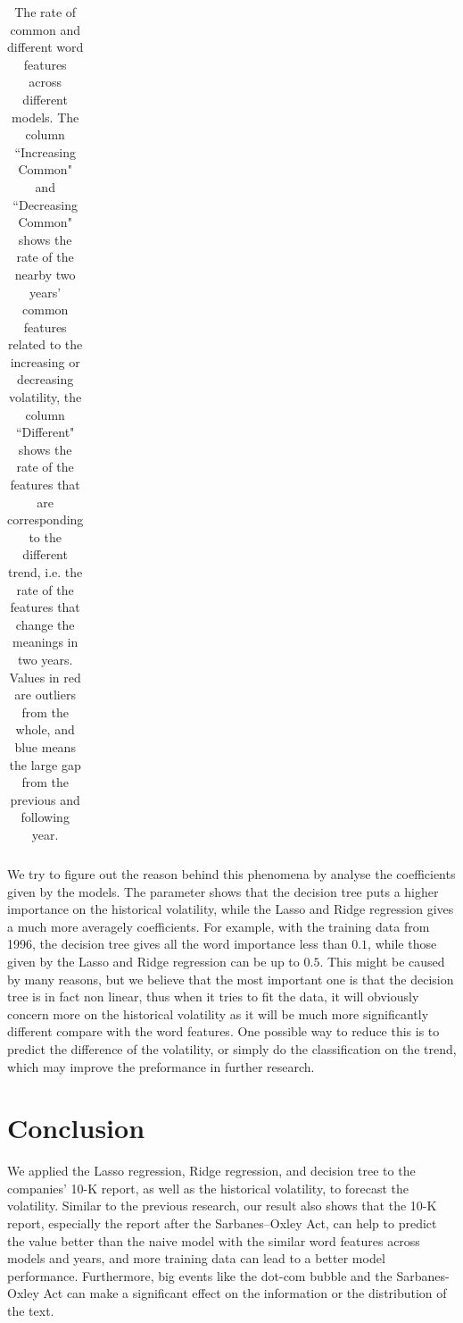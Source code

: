 \documentclass[11pt]{article}
\begin{document}
{\begin{table}[p]
\begin{tabular}{|c|c|c|c|c|}
      \hline
    \end{tabular}
    \caption{The rate of common and different word features across different models. The column ``Increasing Common" and ``Decreasing Common" shows the rate of the nearby two years' common features related to the increasing or decreasing volatility, the column ``Different" shows the rate of the features that are corresponding to the different trend, i.e. the rate of the features that change the meanings in two years. Values in red are outliers from the whole, and blue means the large gap from the previous and following year.}
    \label{table-words-feature-model}
  \end{table}
}

We try to figure out the reason behind this phenomena by analyse the coefficients  given by the models. The parameter shows that the decision tree puts a higher importance on the historical volatility, while the Lasso and Ridge regression gives a much more averagely coefficients. For example, with the training data from 1996, the decision tree gives all the word importance less than $0.1$, while those given by the Lasso and Ridge regression can be up to $0.5$. This might be caused by many reasons, but we believe that the most important one is that the decision tree is in fact non linear, thus when it tries to fit the data, it will obviously concern more on the historical volatility as it will be much more significantly different compare with the word features. One possible way to reduce this is to predict the difference of the volatility, or simply do the classification on the trend, which may improve the preformance in further research.

\section{Conclusion}

We applied the Lasso regression, Ridge regression, and decision tree to the companies' 10-K report, as well as the historical volatility, to forecast the volatility. Similar to the previous research\cite{kogan2009predicting}, our result also shows that the 10-K report, especially the report after the Sarbanes–Oxley Act, can help to predict the value better than the naive model with the similar word features across models and years, and more training data can lead to a better model performance. Furthermore, big events like the dot-com bubble and the Sarbanes-Oxley Act can make a significant effect on the information or the distribution of the text.
\end{document}
